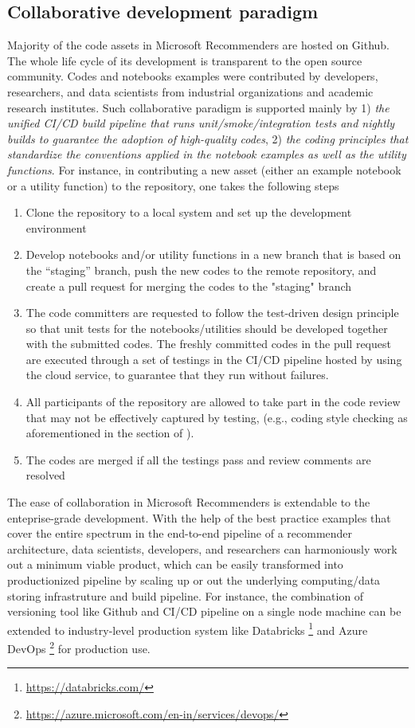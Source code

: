 \subsection{Collaborative development paradigm} %
Majority of the code assets in Microsoft Recommenders are hosted on Github. The whole life cycle of its development is transparent to the open source community. Codes and notebooks examples were contributed by developers, researchers, and data scientists from industrial organizations and academic research institutes. Such collaborative paradigm is supported mainly by 1) \textit{the unified CI/CD build pipeline that runs unit/smoke/integration tests and nightly builds to guarantee the adoption of high-quality codes}, 2) \textit{the coding principles that standardize the conventions applied in the notebook examples as well as the utility functions}. For instance, in contributing a new asset (either an example notebook or a utility function) to the repository, one takes the following steps
\begin{enumerate}
    \item Clone the repository to a local system and set up the development environment
    \item Develop notebooks and/or utility functions in a new branch that is based on the ``staging'' branch, push the new codes to the remote repository, and create a pull request for merging the codes to the "staging" branch
    \item The code committers are requested to follow the test-driven design principle so that unit tests for the notebooks/utilities should be developed together with the submitted codes. The freshly committed codes in the pull request are executed through a set of testings in the CI/CD pipeline hosted by using the cloud service, to guarantee that they run without failures.
    \item All participants of the repository are allowed to take part in the code review that may not be effectively captured by testing, (e.g., coding style checking as aforementioned in the section of ).  
    \item The codes are merged if all the testings pass and review comments are resolved
\end{enumerate}

The ease of collaboration in Microsoft Recommenders is extendable to the enteprise-grade development. With the help of the best practice examples that cover the entire spectrum in the end-to-end pipeline of a recommender architecture, data scientists, developers, and researchers can harmoniously work out a minimum viable product, which can be easily transformed into productionized pipeline by scaling up or out the underlying computing/data storing infrastruture and build pipeline. For instance, the combination of versioning tool like Github and CI/CD pipeline on a single node machine can be extended to industry-level production system like Databricks \footnote{\url{https://databricks.com/}} and Azure DevOps \footnote{\url{https://azure.microsoft.com/en-in/services/devops/}} for production use.